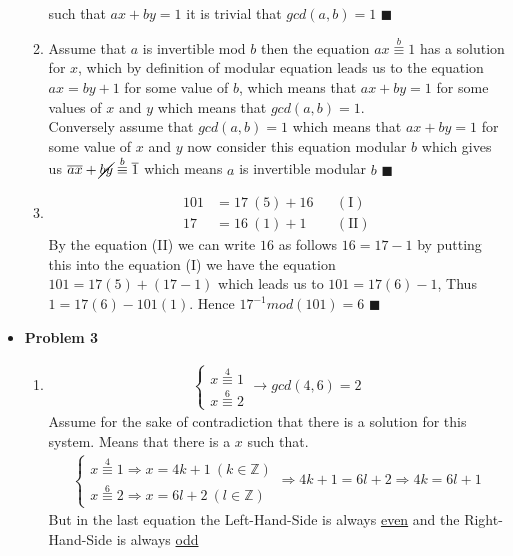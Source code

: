 \documentclass{article}
\begin{document}
\begin{itemize}
\begin{enumerate}[label=(\alph*)]
			such that $ax+by=1$ it is trivial that $gcd(a,b)=1$ $\blacksquare$
		\item 
			Assume that $a$ is invertible mod $b$ then the equation $ax\stackrel{b}{\equiv}1$ has a solution for $x$, which by definition of 
			modular equation leads us to the equation $ax=by+1$ for some value of $b$, which means that $ax+by=1$ for some values of
			$x$ and $y$ which means that $gcd(a,b)=1$.\\
			Conversely assume that $gcd(a,b)=1$ which means that $ax+by=1$ for some value of $x$ and $y$ now consider this equation modular
			$b$ which gives us $\overline{ax}+\cancel{by} \stackrel{b}{\equiv} \overline{1}$ which means $a$ is invertible modular $b$ 
			$\blacksquare$
		\item
			\begin{align*}
				101 &= 17\ (5) + 16  &&(\text{I}) \\
				17  &= 16\ (1) + 1 && (\text{II})
			\end{align*}
			By the equation (II) we can write $16$ as follows $16 = 17 - 1$ by putting this into the equation (I) we have the equation
			$101 = 17(5) + \left(17 - 1 \right)$ which leads us to $101 = 17(6) - 1$, Thus $ 1 = 17(6) - 101(1) $. Hence $17^{-1} mod(101) = 6$ 
			$\blacksquare$
	\end{enumerate}
	\item{\textcolor{for}{\textbf{Problem 3}}}
		\begin{enumerate}[label=(\alph*)]
		\item
		\begin{align*}
			\left\{ \begin{array}{l}
				x \stackrel{4}{\equiv} 1 \\
				x \stackrel{6}{\equiv} 2
			\end{array}\right. \longrightarrow gcd(4,6)=2
		\end{align*}
		Assume for the sake of contradiction that there is a solution for this system. Means that there is a $x$ such that.
		\begin{align*}
			\left\{\begin{array}{l}
					x\stackrel{4}{\equiv}1\Rightarrow x=4k+1\ (k\in\mathbb{Z}) \\ 
					x\stackrel{6}{\equiv}2\Rightarrow x=6l+2\ (l\in\mathbb{Z})
			\end{array}\right.
			\Rightarrow 4k+1=6l+2\Rightarrow 4k=6l+1 
		\end{align*}
		But in the last equation the Left-Hand-Side is always \underline{even} and the Right-Hand-Side is always \underline{odd}

\end{enumerate}
\end{itemize}
\end{document}
